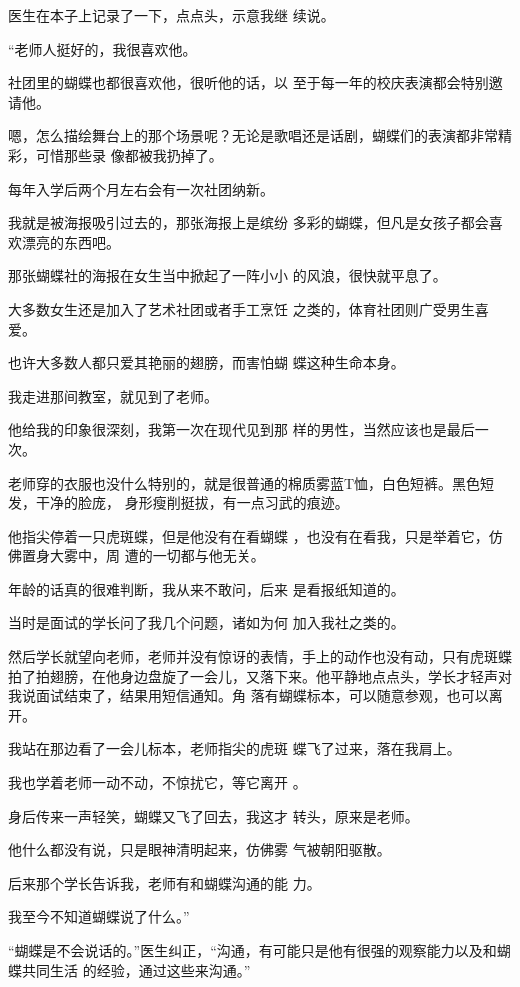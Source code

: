 \documentclass{article}
\begin{document}
医生在本子上记录了一下，点点头，示意我继
续说。 


“老师人挺好的，我很喜欢他。 

社团里的蝴蝶也都很喜欢他，很听他的话，以
至于每一年的校庆表演都会特别邀请他。 

嗯，怎么描绘舞台上的那个场景呢？无论是歌唱还是话剧，蝴蝶们的表演都非常精彩，可惜那些录
像都被我扔掉了。 


每年入学后两个月左右会有一次社团纳新。 

我就是被海报吸引过去的，那张海报上是缤纷
\newpage
多彩的蝴蝶，但凡是女孩子都会喜欢漂亮的东西吧。

那张蝴蝶社的海报在女生当中掀起了一阵小小
的风浪，很快就平息了。 

大多数女生还是加入了艺术社团或者手工烹饪
之类的，体育社团则广受男生喜爱。 

也许大多数人都只爱其艳丽的翅膀，而害怕蝴
蝶这种生命本身。 


我走进那间教室，就见到了老师。 

他给我的印象很深刻，我第一次在现代见到那
样的男性，当然应该也是最后一次。 

老师穿的衣服也没什么特别的，就是很普通的棉质雾蓝T恤，白色短裤。黑色短发，干净的脸庞，
身形瘦削挺拔，有一点习武的痕迹。 

他指尖停着一只虎斑蝶，但是他没有在看蝴蝶
\newpage
，也没有在看我，只是举着它，仿佛置身大雾中，周
遭的一切都与他无关。 

年龄的话真的很难判断，我从来不敢问，后来
是看报纸知道的。 

当时是面试的学长问了我几个问题，诸如为何
加入我社之类的。 

然后学长就望向老师，老师并没有惊讶的表情，手上的动作也没有动，只有虎斑蝶拍了拍翅膀，在他身边盘旋了一会儿，又落下来。他平静地点点头，学长才轻声对我说面试结束了，结果用短信通知。角
落有蝴蝶标本，可以随意参观，也可以离开。 

我站在那边看了一会儿标本，老师指尖的虎斑
蝶飞了过来，落在我肩上。 

我也学着老师一动不动，不惊扰它，等它离开
。 

\newpage

身后传来一声轻笑，蝴蝶又飞了回去，我这才
转头，原来是老师。 

他什么都没有说，只是眼神清明起来，仿佛雾
气被朝阳驱散。 

后来那个学长告诉我，老师有和蝴蝶沟通的能
力。 


我至今不知道蝴蝶说了什么。” 

“蝴蝶是不会说话的。”医生纠正，“沟通，有可能只是他有很强的观察能力以及和蝴蝶共同生活
的经验，通过这些来沟通。” 
\end{document}
